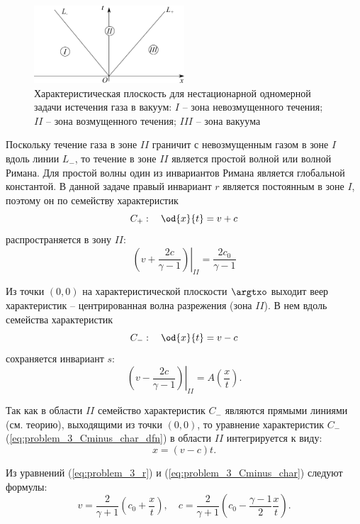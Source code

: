 \documentclass[14pt]{extarticle}
\begin{document}
\begin{figure}
	\centering
	\includegraphics[width=0.5\textwidth]{../img/flow_vacuum_char_plane}
	\caption{Характеристическая плоскость для нестационарной одномерной задачи истечения газа в вакуум: $I$ -- зона невозмущенного течения; $II$ -- зона возмущенного течения; $III$ -- зона вакуума}
	\label{fig:problem_3_characteristic_plane}
\end{figure}




Поскольку течение газа в зоне $II$ граничит с невозмущенным газом в зоне $I$ вдоль линии $L_-$, то течение в зоне $II$ является простой волной или волной Римана. Для простой волны один из инвариантов Римана является глобальной константой. В данной задаче правый инвариант $r$ является постоянным в зоне $I$, поэтому он по семейству характеристик 
\[
C_+:\quad\od{x}{t} = v + c
\]
распространяется в зону $II$:
\begin{equation}
\label{eq:problem_3_r}
\left.\left(v+\frac{2 c}{\gamma-1}\right)\right|_{II} = \frac{2 c_0}{\gamma-1}
\end{equation}

Из точки $(0,0)$ на характеристической плоскости $\argtxo$ выходит веер характеристик -- центрированная волна разрежения (зона $II$). В нем вдоль семейства характеристик
\begin{equation}
	\label{eq:problem_3_Cminus_char_dfn}
C_-:\quad \od{x}{t} = v-c
\end{equation}
сохраняется инвариант $s$: 
\[
\left.\left(v-\frac{2c}{\gamma-1}\right)\right|_{II}=A\left(\frac{x}{t}\right). 
\]

Так как в области $II$ семейство характеристик $C_-$ являются прямыми линиями (см. теорию), выходящими из точки $(0,0)$, то 
уравнение характеристик  $C_-$ (\ref{eq:problem_3_Cminus_char_dfn}) в области $II$ интегрируется к виду:
\begin{equation}
\label{eq:problem_3_Cminus_char}
x = (v-c) t.
\end{equation} 

Из уравнений (\ref{eq:problem_3_r}) и (\ref{eq:problem_3_Cminus_char})  следуют формулы:
\[
v = \frac{2}{\gamma+1} \left( c_0 + \frac{x}{t} \right),\quad
c = \frac{2}{\gamma+1} \left( c_0 - \frac{\gamma-1}{2}\frac{x}{t} \right).
\]
\end{document}
